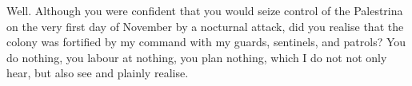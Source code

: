 {  Well. Although you were confident that you would seize control of the Palestrina on the very first day of November by a nocturnal attack, did you realise that the colony was fortified by my command with my guards, sentinels, and patrols? You do nothing, you labour at nothing, you plan nothing, which I do not not only hear, but also see and plainly realise.
}
